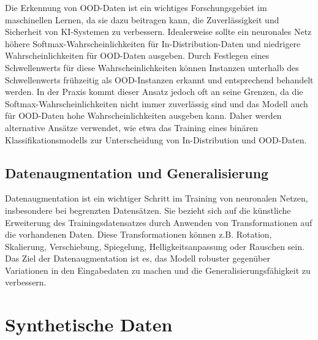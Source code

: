 Die Erkennung von OOD-Daten ist ein wichtiges Forschungsgebiet im maschinellen Lernen, da sie dazu beitragen kann, die Zuverlässigkeit und Sicherheit von KI-Systemen zu verbessern. Idealerweise sollte ein neuronales Netz höhere Softmax-Wahrscheinlichkeiten für In-Distribution-Daten und niedrigere Wahrscheinlichkeiten für OOD-Daten ausgeben. Durch Festlegen eines Schwellenwerts für diese Wahrscheinlichkeiten können Instanzen unterhalb des Schwellenwerts frühzeitig als OOD-Instanzen erkannt und entsprechend behandelt werden. In der Praxis kommt dieser Ansatz jedoch oft an seine Grenzen, da die Softmax-Wahrscheinlichkeiten nicht immer zuverlässig sind und das Modell auch für OOD-Daten hohe Wahrscheinlichkeiten ausgeben kann. Daher werden alternative Ansätze verwendet, wie etwa das Training eines binären Klassifikationsmodells zur Unterscheidung von In-Distribution und OOD-Daten.

\subsection{Datenaugmentation und Generalisierung}

Datenaugmentation ist ein wichtiger Schritt im Training von neuronalen Netzen, insbesondere bei begrenzten Datensätzen. Sie bezieht sich auf die künstliche Erweiterung des Trainingsdatensatzes durch Anwenden von Transformationen auf die vorhandenen Daten. Diese Transformationen können z.B. Rotation, Skalierung, Verschiebung, Spiegelung, Helligkeitsanpassung oder Rauschen sein. Das Ziel der Datenaugmentation ist es, das Modell robuster gegenüber Variationen in den Eingabedaten zu machen und die Generalisierungsfähigkeit zu verbessern.


\section{Synthetische Daten}


